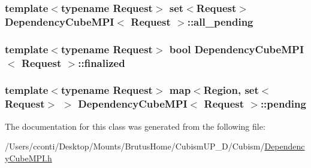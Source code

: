 \subsubsection[{all\+\_\+pending}]{\setlength{\rightskip}{0pt plus 5cm}template$<$typename Request$>$ set$<$Request$>$ {\bf Dependency\+Cube\+M\+P\+I}$<$ Request $>$\+::all\+\_\+pending}\label{class_dependency_cube_m_p_i_a4996ead8bdfbf954562d0177b6c24607}
\hypertarget{class_dependency_cube_m_p_i_a79cbdbeafcdad83edcfe7bfb786e8dbb}{}
\subsubsection[{finalized}]{\setlength{\rightskip}{0pt plus 5cm}template$<$typename Request$>$ bool {\bf Dependency\+Cube\+M\+P\+I}$<$ Request $>$\+::finalized}\label{class_dependency_cube_m_p_i_a79cbdbeafcdad83edcfe7bfb786e8dbb}
\hypertarget{class_dependency_cube_m_p_i_a15e719dff5340ab953286ba4b9301a54}{}
\subsubsection[{pending}]{\setlength{\rightskip}{0pt plus 5cm}template$<$typename Request$>$ map$<${\bf Region}, set$<$Request$>$ $>$ {\bf Dependency\+Cube\+M\+P\+I}$<$ Request $>$\+::pending}\label{class_dependency_cube_m_p_i_a15e719dff5340ab953286ba4b9301a54}


The documentation for this class was generated from the following file\+:\begin{DoxyCompactItemize}
\item 
/\+Users/cconti/\+Desktop/\+Mounts/\+Brutus\+Home/\+Cubism\+U\+P\+\_\+D/\+Cubism/\hyperlink{_dependency_cube_m_p_i_8h}{Dependency\+Cube\+M\+P\+I.\+h}\end{DoxyCompactItemize}
